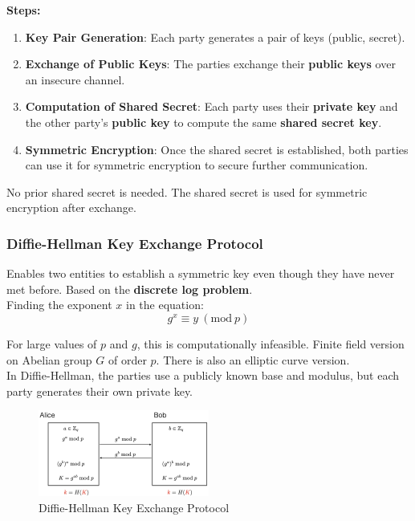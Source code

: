 \textbf{Steps:}
\begin{enumerate}
    \item \textbf{Key Pair Generation}: Each party generates a pair of keys (public, secret).
    
    \item \textbf{Exchange of Public Keys}: The parties exchange their \textbf{public keys} over an insecure channel.
    
    \item \textbf{Computation of Shared Secret}: Each party uses their \textbf{private key} and the other party's \textbf{public key} to compute the same \textbf{shared secret key}.
    
    \item \textbf{Symmetric Encryption}: Once the shared secret is established, both parties can use it for symmetric encryption to secure further communication.
\end{enumerate}

No prior shared secret is needed. The shared secret is used for symmetric encryption after exchange.

\subsubsection{Diffie-Hellman Key Exchange Protocol}
Enables two entities to establish a symmetric key even though they have never met before. Based on the \textbf{discrete log problem}. \\

Finding the exponent \( x \) in the equation:
\[
g^x \equiv y \ (\text{mod} \ p)
\]

For large values of \( p \) and \( g \), this is computationally infeasible. 
Finite field version on Abelian group $G$ of order $p$. There is also an elliptic curve version. \\

In Diffie-Hellman, the parties use a publicly known base and modulus, but each party generates their own private key.

\begin{figure}[h!]
    \centering
    \includegraphics[width=0.5\textwidth]{img/DHkeyprotocol.png}
    \caption{Diffie-Hellman Key Exchange Protocol}
\end{figure}

